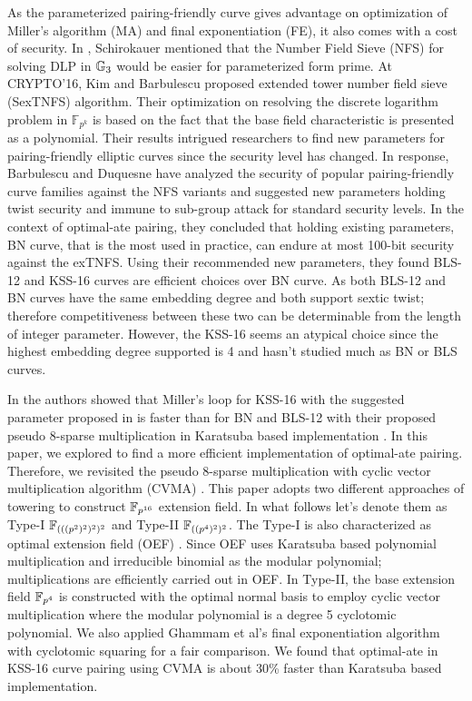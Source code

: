 As the parameterized pairing-friendly curve gives advantage on optimization of Miller's algorithm (MA) and final exponentiation (FE), it also comes with a cost of security. 
In \cite{DBLP:journals/moc/Schirokauer10}, Schirokauer mentioned that the Number Field Sieve (NFS) for solving DLP in ${\mathbb{G}}_{3}$ would be easier for parameterized form prime. 
At CRYPTO'16, Kim and Barbulescu proposed extended tower number field sieve (SexTNFS) algorithm\cite{C:KimBar16}.
Their optimization on resolving the discrete logarithm problem in $\mathbb{F}_{p^k}$ is based on the fact that the base field characteristic is presented as a polynomial.
Their results intrigued researchers to find new parameters for pairing-friendly elliptic curves since the security level has changed.
In response, Barbulescu and Duquesne have analyzed the security of popular pairing-friendly curve families against the NFS variants and suggested new parameters \cite{sylvain_new_param} holding twist security and immune to sub-group attack for standard security levels. 
In the context of optimal-ate pairing, they concluded that holding existing parameters, BN curve, that is the most used in practice, can endure at most 100-bit security against the exTNFS.  
Using their recommended new parameters, they found BLS-12 and KSS-16 curves are efficient choices over BN curve.
As both BLS-12 and BN curves have the same embedding degree and both support sextic twist; therefore competitiveness between these two can be determinable from the length of integer parameter.
However, the KSS-16 seems an atypical choice since the highest embedding degree supported is 4 and hasn't studied much as BN or BLS curves.

In \cite{INDOCRYPT:KNGDNK17} the authors showed that Miller's loop for KSS-16 with the suggested parameter proposed in \cite{sylvain_new_param} is faster than for BN and BLS-12 with their proposed pseudo 8-sparse multiplication in Karatsuba based implementation \cite{INDOCRYPT:KNGDNK17}.
In this paper, we explored to find a more efficient implementation of optimal-ate pairing. 
Therefore, we revisited the pseudo 8-sparse multiplication with cyclic vector multiplication algorithm (CVMA) \cite{cvma_kato}.
This paper adopts two different approaches of towering to construct $\mathbb{F}_{p^{16}}$ extension field. 
In what follows let's denote them as Type-I $\mathbb{F}_{(((p^2)^2)^2)^2}$ and Type-II  $\mathbb{F}_{((p^4)^2)^2}$.
The Type-I is also characterized as optimal extension field (OEF) \cite{JC:BaiPaa01}.
Since OEF uses Karatsuba based polynomial multiplication and irreducible binomial as the modular polynomial;  multiplications are efficiently carried out in OEF. 
In Type-II,  the base extension field $\mathbb{F}_{p^4}$ is constructed with the optimal normal basis to employ cyclic vector multiplication where the modular polynomial is a degree 5 cyclotomic polynomial.
We also applied Ghammam et al's \cite{EPRINT:GhaFou16b} final exponentiation algorithm with cyclotomic squaring \cite{DBLP:journals/moc/Karabina13} for a fair comparison.
We found that optimal-ate in KSS-16 curve pairing using CVMA is about 30\% faster than Karatsuba based implementation.

